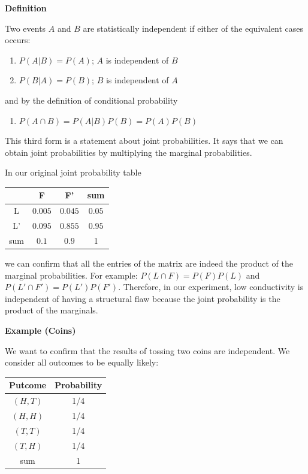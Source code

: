 \documentclass[
]{book}
\providecommand{\tightlist}{%
  \setlength{\itemsep}{0pt}\setlength{\parskip}{0pt}}
\begin{document}
\textbf{Definition}

Two events \(A\) and \(B\) are statistically independent if either of the equivalent cases occurs:

\begin{enumerate}
\def\labelenumi{\arabic{enumi})}
\tightlist
\item
  \(P(A| B)= P(A)\); \(A\) is independent of \(B\)
\item
  \(P(B| A)= P(B)\); \(B\) is independent of \(A\)
\end{enumerate}

and by the definition of conditional probability

\begin{enumerate}
\def\labelenumi{\arabic{enumi})}
\setcounter{enumi}{2}
\tightlist
\item
  \(P(A\cap B)=P(A|B)P(B)=P(A)P(B)\)
\end{enumerate}

This third form is a statement about joint probabilities. It says that we can obtain joint probabilities by multiplying the marginal probabilities.

In our original joint probability table

\begin{longtable}[]{@{}cccc@{}}
\toprule\noalign{}
& F & F' & sum \\
\midrule\noalign{}
\endhead
\bottomrule\noalign{}
\endlastfoot
L & \(0.005\) & \(0.045\) & \(0.05\) \\
L' & \(0.095\) & \(0.855\) & \(0.95\) \\
sum & \(0.1\) & \(0.9\) & 1 \\
\end{longtable}

we can confirm that all the entries of the matrix are indeed the product of the marginal probabilities. For example: \(P( L \cap F)=P(F)P(L)\) and \(P(L' \cap F')=P(L')P(F')\). Therefore, in our experiment, low conductivity is independent of having a structural flaw because the joint probability is the product of the marginals.

\textbf{Example (Coins)}

We want to confirm that the results of tossing two coins are independent. We consider all outcomes to be equally likely:

\begin{longtable}[]{@{}cc@{}}
\toprule\noalign{}
Putcome & Probability \\
\midrule\noalign{}
\endhead
\bottomrule\noalign{}
\endlastfoot
\(( H,T )\) & 1/4 \\
\(( H,H )\) & 1/4 \\
\(( T,T )\) & 1/4 \\
\(( T, H )\) & 1/4 \\
sum & 1 \\
\end{longtable}
\end{document}
